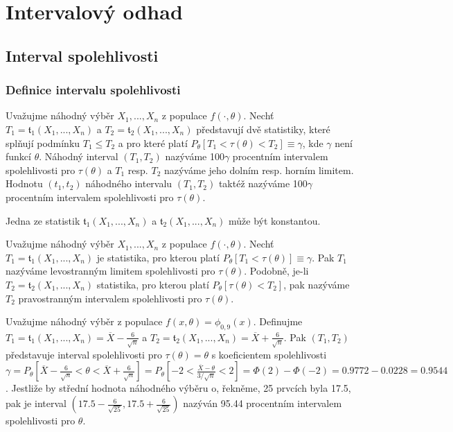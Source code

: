 \chapter{Intervalový odhad}

\section{Interval spolehlivosti}

\subsection{Definice intervalu spolehlivosti}

\begin{definition}
Uvažujme náhodný výběr $X_1, ..., X_n$ z populace $f(\cdot, \theta)$. Nechť $T_1 = \mathfrak{t}_1(X_1, ..., X_n)$ a $T_2 = \mathfrak{t}_2(X_1, ..., X_n)$ představují dvě statistiky, které splňují podmínku $T_1 \le T_2$ a pro které platí $P_{\theta}[T_1 < \tau(\theta) < T_2] \equiv \gamma$, kde $\gamma$ není funkcí $\theta$. Náhodný interval $(T_1, T_2)$ nazýváme 100$\gamma$ procentním intervalem spolehlivosti pro $\tau(\theta)$ a $T_1$ resp. $T_2$ nazýváme jeho dolním resp. horním limitem. Hodnotu  $(t_1, t_2)$ náhodného intervalu $(T_1, T_2)$ taktéž nazýváme 100$\gamma$ procentním intervalem spolehlivosti pro $\tau(\theta)$.
\end{definition}

Jedna ze statistik $\mathfrak{t}_1(X_1, ..., X_n)$ a $\mathfrak{t}_2(X_1, ..., X_n)$ může být konstantou.

\begin{definition}
Uvažujme náhodný výběr $X_1, ..., X_n$ z populace $f(\cdot, \theta)$. Nechť $T_1 = \mathfrak{t}_1(X_1, ..., X_n)$ je statistika, pro kterou platí $P_{\theta}[T_1 < \tau(\theta)] \equiv \gamma$. Pak $T_1$ nazýváme levostranným limitem spolehlivosti pro $\tau(\theta)$. Podobně, je-li $T_2 = \mathfrak{t}_2(X_1, ..., X_n)$ statistika, pro kterou platí $P_{\theta}[\tau(\theta) < T_2]$, pak nazýváme $T_2$ pravostranným intervalem spolehlivosti pro $\tau(\theta)$.
\end{definition}

\begin{example}
Uvažujme náhodný výběr z populace $f(x, \theta) = \phi_{0, 9}(x)$. Definujme $T_1 = \mathfrak{t}_1(X_1, ..., X_n) = \overline{X} - \frac{6}{\sqrt{n}}$ a $T_2 = \mathfrak{t}_2(X_1, ..., X_n) = \overline{X} + \frac{6}{\sqrt{n}}$. Pak $(T_1, T_2)$ představuje interval spolehlivosti pro $\tau(\theta) = \theta$ s koeficientem spolehlivosti $\gamma = P_{\theta}[\overline{X} - \frac{6}{\sqrt{n}} < \theta < \overline{X} + \frac{6}{\sqrt{n}}] = P_{\theta}[-2 < \frac{\overline{X} - \theta}{3 / \sqrt{n}} < 2] = \Phi(2) - \Phi(-2) = 0.9772 - 0.0228 = 0.9544$. Jestliže by střední hodnota náhodného výběru o, řekněme, 25 prvcích byla 17.5, pak je interval $(17.5 - \frac{6}{\sqrt{25}}, 17.5 + \frac{6}{\sqrt{25}})$ nazýván 95.44 procentním intervalem spolehlivosti pro $\theta$.
\end{example}

